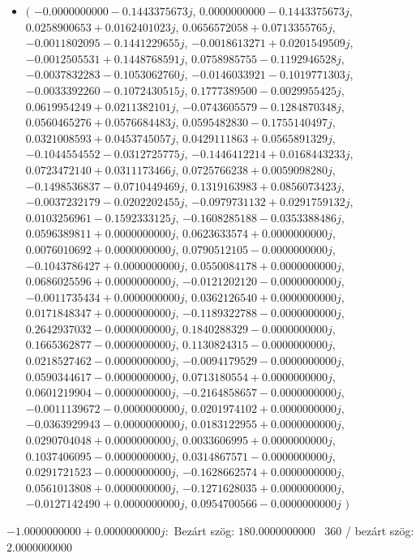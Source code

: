 \documentclass[14pt,a4paper]{article}
\begin{document}
\begin{itemize}
\item
$\big($
$-0.0000000000-0.1443375673j$, $0.0000000000-0.1443375673j$, $0.0258900653+0.0162401023j$, $0.0656572058+0.0713355765j$, $-0.0011802095-0.1441229655j$, $-0.0018613271+0.0201549509j$, $-0.0012505531+0.1448768591j$, $0.0758985755-0.1192946528j$, $-0.0037832283-0.1053062760j$, $-0.0146033921-0.1019771303j$, $-0.0033392260-0.1072430515j$, $0.1777389500-0.0029955425j$, $0.0619954249+0.0211382101j$, $-0.0743605579-0.1284870348j$, $0.0560465276+0.0576684483j$, $0.0595482830-0.1755140497j$, $0.0321008593+0.0453745057j$, $0.0429111863+0.0565891329j$, $-0.1044554552-0.0312725775j$, $-0.1446412214+0.0168443233j$, $0.0723472140+0.0311173466j$, $0.0725766238+0.0059098280j$, $-0.1498536837-0.0710449469j$, $0.1319163983+0.0856073423j$, $-0.0037232179-0.0202202455j$, $-0.0979731132+0.0291759132j$, $0.0103256961-0.1592333125j$, $-0.1608285188-0.0353388486j$, $0.0596389811+0.0000000000j$, $0.0623633574+0.0000000000j$, $0.0076010692+0.0000000000j$, $0.0790512105-0.0000000000j$, $-0.1043786427+0.0000000000j$, $0.0550084178+0.0000000000j$, $0.0686025596+0.0000000000j$, $-0.0121202120-0.0000000000j$, $-0.0011735434+0.0000000000j$, $0.0362126540+0.0000000000j$, $0.0171848347+0.0000000000j$, $-0.1189322788-0.0000000000j$, $0.2642937032-0.0000000000j$, $0.1840288329-0.0000000000j$, $0.1665362877-0.0000000000j$, $0.1130824315-0.0000000000j$, $0.0218527462-0.0000000000j$, $-0.0094179529-0.0000000000j$, $0.0590344617-0.0000000000j$, $0.0713180554+0.0000000000j$, $0.0601219904-0.0000000000j$, $-0.2164858657-0.0000000000j$, $-0.0011139672-0.0000000000j$, $0.0201974102+0.0000000000j$, $-0.0363929943-0.0000000000j$, $0.0183122955+0.0000000000j$, $0.0290704048+0.0000000000j$, $0.0033606995+0.0000000000j$, $0.1037406095-0.0000000000j$, $0.0314867571-0.0000000000j$, $0.0291721523-0.0000000000j$, $-0.1628662574+0.0000000000j$, $0.0561013808+0.0000000000j$, $-0.1271628035+0.0000000000j$, $-0.0127142490+0.0000000000j$, $0.0954700566-0.0000000000j$
$\big)$
\end{itemize}
$-1.0000000000+0.0000000000j$:\
Bezárt szög: $180.0000000000$ \
360 / bezárt szög: $2.0000000000$\
\end{document}
